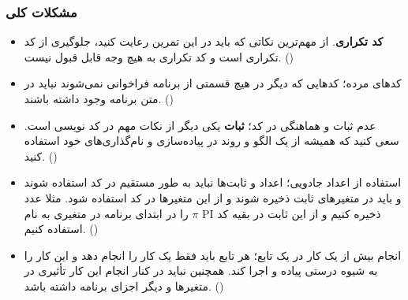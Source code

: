 \documentclass{utap}
\begin{document}
	\subsubsection{مشکلات کلی}
	  \begin{itemize}
	        \item
\textbf{کد تکراری}.
از مهم‌ترین نکاتی که باید در این تمرین رعایت کنید، جلوگیری از کد تکراری است و کد تکراری به هیچ وجه قابل قبول نیست. ()
		\item
کدهای مرده؛ کدهایی که دیگر در هیچ قسمتی از برنامه فراخوانی نمی‌شوند نباید در متن برنامه وجود داشته باشند. ()
		\item
عدم ثبات و هماهنگی در کد؛ \textbf{ثبات} یکی دیگر از نکات مهم در کد نویسی است. سعی کنید که همیشه از یک الگو و روند در پیاده‌سازی و نام‌گذاری‌های خود استفاده کنید. ()
		\item
استفاده از اعداد جادویی؛ اعداد و ثابت‌ها نباید به طور مستقیم در کد استفاده شوند و باید در متغیر‌های ثابت ذخیره شوند و از این متغیر‌ها در کد استفاده شود. مثلا عدد $\pi$ را در ابتدای برنامه در متغیری به نام PI ذخیره کنیم و از این ثابت در بقیه کد استفاده کنیم. ()
		\item
انجام بیش از یک کار در یک تابع؛ هر تابع باید فقط یک کار را انجام دهد و این کار را به شیوه درستی پیاده و اجرا کند. همچنین نباید در کنار انجام این کار تأثیری در متغیرها و دیگر اجزای برنامه داشته باشد. ()

	   \end{itemize}
\end{document}
